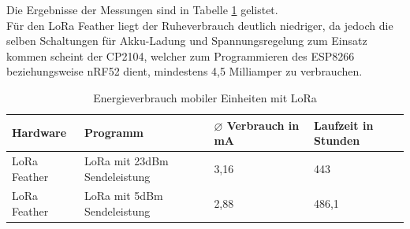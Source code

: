 Die Ergebnisse der Messungen sind in Tabelle \ref{table:lora235ina} gelistet.\\
Für den LoRa Feather liegt der Ruheverbrauch deutlich niedriger, da jedoch die selben Schaltungen für Akku-Ladung und Spannungsregelung zum Einsatz kommen scheint der CP2104, welcher zum Programmieren des ESP8266 beziehungsweise nRF52 dient, mindestens 4,5 Milliamper zu verbrauchen.

\begin{table}[h!]
	\centering
	\caption{Energieverbrauch mobiler Einheiten mit LoRa}
	\label{table:lora235ina}
	\begin{tabular}{p{3.5cm}|p{5cm}|p{2.5cm}|p{2.5cm}}
		Hardware & Programm & $\varnothing$ Verbrauch in mA & Laufzeit in Stunden\\
		\hline
		LoRa Feather & LoRa mit 23dBm Sendeleistung & 3,16 & 443\\
		LoRa Feather & LoRa mit 5dBm Sendeleistung & 2,88 & 486,1\\
	\end{tabular}
\end{table}


